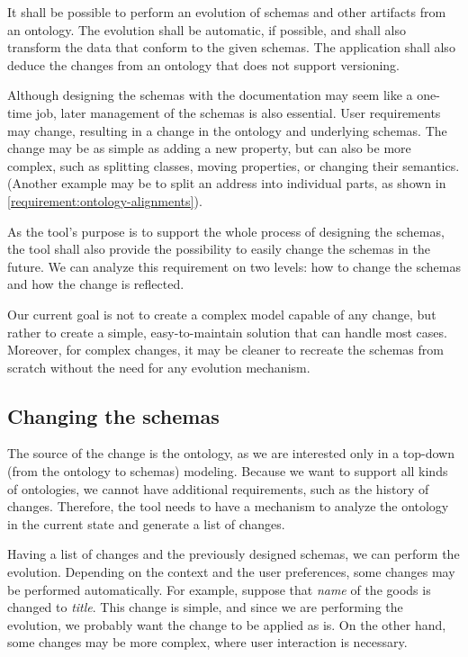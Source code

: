 \begin{requirement}
    It shall be possible to perform an evolution of schemas and other artifacts from an ontology. The evolution shall be automatic, if possible, and shall also transform the data that conform to the given schemas. The application shall also deduce the changes from an ontology that does not support versioning.
    \label{requirement:evolution}
\end{requirement}

Although designing the schemas with the documentation may seem like a one-time job, later management of the schemas is also essential. User requirements may change, resulting in a change in the ontology and underlying schemas. The change may be as simple as adding a new property, but can also be more complex, such as splitting classes, moving properties, or changing their semantics. (Another example may be to split an address into individual parts, as shown in \autoref{requirement:ontology-alignments}).

As the tool's purpose is to support the whole process of designing the schemas, the tool shall also provide the possibility to easily change the schemas in the future. We can analyze this requirement on two levels: how to change the schemas and how the change is reflected.

Our current goal is not to create a complex model capable of any change, but rather to create a simple, easy-to-maintain solution that can handle most cases. Moreover, for complex changes, it may be cleaner to recreate the schemas from scratch without the need for any evolution mechanism.

\subsection*{Changing the schemas}

The source of the change is the ontology, as we are interested only in a top-down (from the ontology to schemas) modeling. Because we want to support all kinds of ontologies, we cannot have additional requirements, such as the history of changes. Therefore, the tool needs to have a mechanism to analyze the ontology in the current state and generate a list of changes.

Having a list of changes and the previously designed schemas, we can perform the evolution. Depending on the context and the user preferences, some changes may be performed automatically. For example, suppose that \textit{name} of the goods is changed to \textit{title}. This change is simple, and since we are performing the evolution, we probably want the change to be applied as is. On the other hand, some changes may be more complex, where user interaction is necessary.

